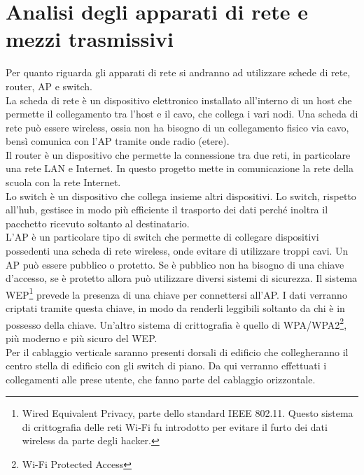 \section{Analisi degli apparati di rete e mezzi trasmissivi}
Per quanto riguarda gli apparati di rete si andranno ad utilizzare schede di rete, router, AP e switch.\\
\hspace{24pt}La scheda di rete è un dispositivo elettronico installato all'interno di un host che permette il collegamento tra l'host e il cavo, che collega i vari nodi. Una scheda di rete può essere wireless, ossia non ha bisogno di un collegamento fisico via cavo, bensì comunica con l'AP tramite onde radio (etere).\\
\hspace{24pt}Il router è un dispositivo che permette la connessione tra due reti, in particolare una rete LAN e Internet. In questo progetto mette in comunicazione la rete della scuola con la rete Internet.\\
\hspace{24pt}Lo switch è un dispositivo che collega insieme altri dispositivi. Lo switch, rispetto all'hub, gestisce in modo più efficiente il trasporto dei dati perché inoltra il pacchetto ricevuto soltanto al destinatario.\\
\hspace{24pt}L'AP è un particolare tipo di switch che permette di collegare dispositivi possedenti una scheda di rete wireless, onde evitare di utilizzare troppi cavi. Un AP può essere pubblico o protetto. Se è pubblico non ha bisogno di una chiave d'accesso, se è protetto allora può utilizzare diversi sistemi di sicurezza. Il sistema WEP\footnote{Wired Equivalent Privacy, parte dello standard IEEE 802.11. Questo sistema di crittografia delle reti Wi-Fi fu introdotto per evitare il furto dei dati wireless da parte degli hacker.} prevede la presenza di una chiave per connettersi all'AP. I dati verranno criptati tramite questa chiave, in modo da renderli leggibili soltanto da chi è in possesso della chiave. Un'altro sistema di crittografia è quello di WPA/WPA2\footnote{Wi-Fi Protected Access}, più moderno e più sicuro del WEP.\\
\hspace{24pt}Per il cablaggio verticale saranno presenti dorsali di edificio che collegheranno il centro stella di edificio con gli switch di piano. Da qui verranno effettuati i collegamenti alle prese utente, che fanno parte del cablaggio orizzontale.